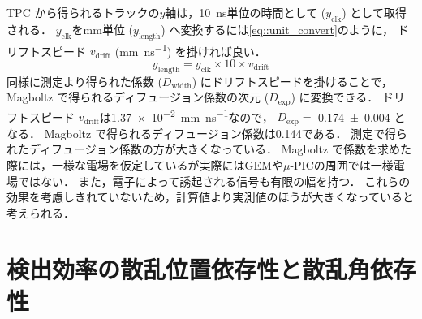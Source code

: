 \documentclass[../master]{subfiles}
\begin{document}
TPC から得られるトラックの$y$軸は，\SI{10}{\nano\second}単位の時間として ($y_{\text{clk}}$) として取得される．
$y_{\text{clk}}$を\si{\milli\metre}単位 ($y_{\text{length}}$) へ変換するには\eqref{eq::unit_convert}のように，
ドリフトスピード $v_{\text{drift}}$ (\si{\milli\metre\per\nano\second}) を掛ければ良い．
\begin{equation}
  y_{\text{length}} = y_{\text{clk}}\times 10\times v_{\text{drift}} \label{eq::unit_convert}
\end{equation}
同様に測定より得られた係数 ($D_{\text{width}}$) にドリフトスピードを掛けることで，
Magboltz で得られるディフュージョン係数の次元 ($D_{\text{exp}}$) に変換できる．
ドリフトスピード $v_{\text{drift}}$は\SI{1.37e-2}{\milli\metre\per\nano\second}なので，
$D_{\text{exp}} = $%
\SI{0.174\pm0.004}{\sqrt{\milli\metre}}
となる．
Magboltz で得られるディフュージョン係数は\SI{0.144}{\sqrt{\milli\metre}}である．
測定で得られたディフュージョン係数の方が大きくなっている．
Magboltz で係数を求めた際には，一様な電場を仮定しているが実際にはGEMや$\mu$-PICの周囲では一様電場ではない．
また，電子によって誘起される信号も有限の幅を持つ．
これらの効果を考慮しきれていないため，計算値より実測値のほうが大きくなっていると考えられる．

\section{検出効率の散乱位置依存性と散乱角依存性}
\end{document}
